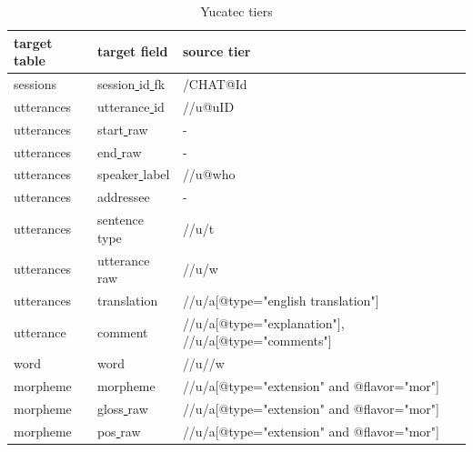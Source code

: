\documentclass[a4paper, 11pt]{book}
\newcommand{\und}{\underline{{ }}\hspace{0.2mm}}	%
\begin{document}
\begin{table}[ht!]
	\centering
	\begin{tabular}{lll}
		\toprule
			\textbf{target table} & \textbf{target field} & \textbf{source tier} \\
		\midrule
			sessions 	& session\und id\und fk 	& /CHAT@Id \\
			utterances 	& utterance\und id	& //u@uID \\
			utterances 	& start\und raw		& - \\
			utterances 	& end\und raw		& - \\
			utterances 	& speaker\und label	& //u@who \\
			utterances 	& addressee			& - \\
			utterances 	& sentence\und type	& //u/t \\
			utterances 	& utterance\und raw	& //u/w \\
			utterances 	& translation		& //u/a[@type="english translation"] \\
			utterance 	& comment			& //u/a[@type="explanation"], //u/a[@type="comments"] \\
			word	 	& word		& //u//w \\ %
			morpheme	& morpheme			& //u/a[@type="extension" and @flavor="mor"] \\ %
			morpheme	& gloss\und raw		& //u/a[@type="extension" and @flavor="mor"] \\ %
			morpheme	& pos\und raw		& //u/a[@type="extension" and @flavor="mor"] \\ %

		\bottomrule
	\end{tabular}
	\caption{Yucatec tiers}
	\label{tab:Yucatec tiers}
\end{table}
\end{document}
